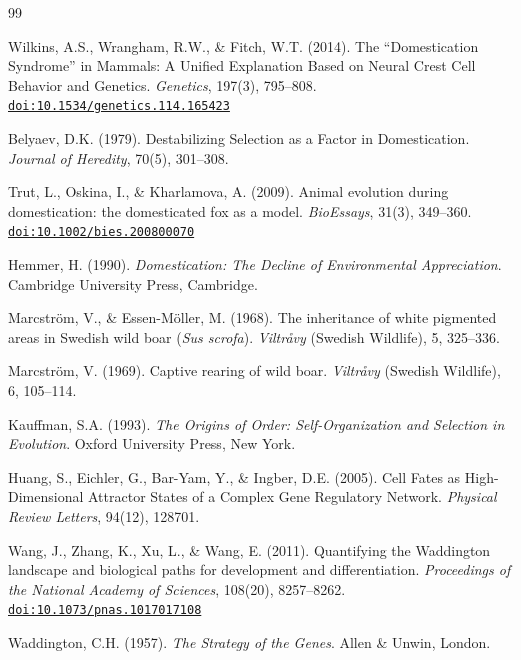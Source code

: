\documentclass[11pt, a4paper]{article}
\begin{document}
\newpage
\begin{thebibliography}{99}

Wilkins, A.S., Wrangham, R.W., \& Fitch, W.T. (2014).
The ``Domestication Syndrome'' in Mammals: A Unified
Explanation Based on Neural Crest Cell Behavior and
Genetics.
\textit{Genetics}, 197(3), 795--808.
\href{https://doi.org/10.1534/genetics.114.165423}
{\texttt{doi:10.1534/genetics.114.165423}}

Belyaev, D.K. (1979).
Destabilizing Selection as a Factor in Domestication.
\textit{Journal of Heredity}, 70(5), 301--308.

Trut, L., Oskina, I., \& Kharlamova, A. (2009).
Animal evolution during domestication: the domesticated
fox as a model.
\textit{BioEssays}, 31(3), 349--360.
\href{https://doi.org/10.1002/bies.200800070}
{\texttt{doi:10.1002/bies.200800070}}

Hemmer, H. (1990).
\textit{Domestication: The Decline of Environmental
Appreciation}.
Cambridge University Press, Cambridge.

Marcstr\"{o}m, V., \& Essen-M\"{o}ller, M. (1968).
The inheritance of white pigmented areas in Swedish
wild boar (\textit{Sus scrofa}).
\textit{Viltr\aa{}vy} (Swedish Wildlife),
5, 325--336.

Marcstr\"{o}m, V. (1969).
Captive rearing of wild boar.
\textit{Viltr\aa{}vy} (Swedish Wildlife),
6, 105--114.

Kauffman, S.A. (1993).
\textit{The Origins of Order: Self-Organization and
Selection in Evolution}.
Oxford University Press, New York.

Huang, S., Eichler, G., Bar-Yam, Y., \&
Ingber, D.E. (2005).
Cell Fates as High-Dimensional Attractor States of a
Complex Gene Regulatory Network.
\textit{Physical Review Letters}, 94(12), 128701.

Wang, J., Zhang, K., Xu, L., \& Wang, E. (2011).
Quantifying the Waddington landscape and biological
paths for development and differentiation.
\textit{Proceedings of the National Academy of Sciences},
108(20), 8257--8262.
\href{https://doi.org/10.1073/pnas.1017017108}
{\texttt{doi:10.1073/pnas.1017017108}}

Waddington, C.H. (1957).
\textit{The Strategy of the Genes}.
Allen \& Unwin, London.


\end{thebibliography}
\end{document}
